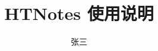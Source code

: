 
\usepackage{zhlipsum}
\usepackage{HTNotes-code}

\title{HTNotes 使用说明}
\author{张三}
\HTset{
}

\renewcommand\theequation{\arabic{section}-\arabic{equation}}